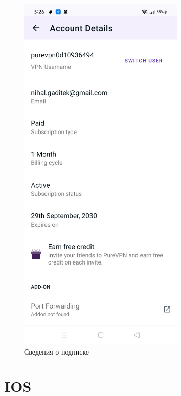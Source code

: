 \begin{itemize}
\begin{figure}[H]
\includegraphics[width=8cm]{41.png}
\centering
\caption{Сведения о подписке}
\label{fig:55}
\end{figure}
\end{itemize}

\section{IOS}

